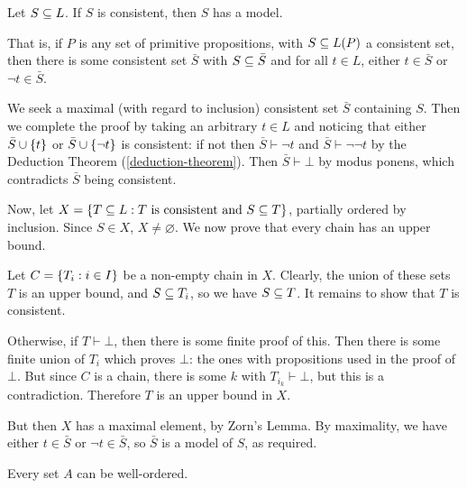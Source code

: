 \documentclass{article}
\begin{document}
\begin{theorem}
	\label{general-model-existence-lemma}
    Let $S \subseteq L$. If $S$ is consistent, then $S$ has a model.
    
    That is, if $P$ is any set of primitive propositions, with $S \subseteq L(P)$ a consistent set, then there is some consistent set $\bar S$ with $S \subseteq \bar S$ and for all $t \in L$, either $t \in \bar S$ or $\lnot t \in \bar S$.
\end{theorem}

\begin{prf}
    We seek a maximal (with regard to inclusion) consistent set $\bar S$ containing $S$. Then we complete the proof by taking an arbitrary $t \in L$ and noticing that either $\bar S \cup \left\lbrace t \right\rbrace$ or $\bar S \cup \left\lbrace \lnot t \right\rbrace$ is consistent: if not then $\bar S \vdash \lnot t$ and $\bar S \vdash \lnot \lnot t$ by the Deduction Theorem (\ref{deduction-theorem}). Then $\bar S \vdash \bot$ by modus ponens, which contradicts $\bar S$ being consistent.
    
    Now, let $X = \left\lbrace T \subseteq L : T \text{ is consistent and } S \subseteq T \right\rbrace$, partially ordered by inclusion. Since $S \in X$, $X \neq \varnothing$. We now prove that every chain has an upper bound.
    
    Let $C = \left\lbrace T_i : i \in I \right\rbrace$ be a non-empty chain in $X$. Clearly, the union of these sets $T$ is an upper bound, and $S \subseteq T_i$, so we have $S \subseteq T$. It remains to show that $T$ is consistent.
    
    Otherwise, if $T \vdash \bot$, then there is some finite proof of this. Then there is some finite union of $T_i$ which proves $\bot$: the ones with propositions used in the proof of $\bot$. But since $C$ is a chain, there is some $k$ with $T_{i_k} \vdash \bot$, but this is a contradiction. Therefore $T$ is an upper bound in $X$.
    
	But then $X$ has a maximal element, by Zorn's Lemma. By maximality, we have either $t \in \bar S$ or $\lnot t \in \bar S$, so $\bar S$ is a model of $S$, as required.
\end{prf}

\begin{theorem}
	\label{well-ordering-principle}
    Every set $A$ can be well-ordered.
\end{theorem}
\end{document}
